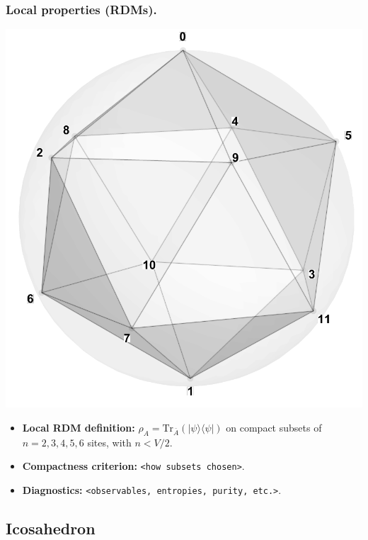 \documentclass[11pt,a4paper]{article}
\begin{document}
\subsubsection*{Local properties (RDMs).}
\begin{center}
  \includegraphics[width=.6\linewidth]{icosahedron}
\end{center}

\begin{itemize}[leftmargin=1.5em]
  \item \textbf{Local RDM definition:} $\rho_A=\mathrm{Tr}_{\bar A}(|\psi\rangle\langle\psi|)$ on compact subsets of $n=2,3,4,5,6$ sites, with $n < V/2$.
  \item \textbf{Compactness criterion:} \texttt{<how subsets chosen>}.
  \item \textbf{Diagnostics:} \texttt{<observables, entropies, purity, etc.>}.
\end{itemize}


\subsection*{Icosahedron}
\end{document}
